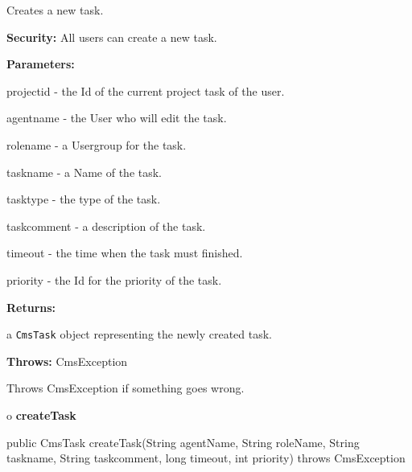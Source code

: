 \begin{description}
\htmlDD Creates a new task. 

{\bf Security:} All users can create a new task. 

\begin{description}
\item {\bf Parameters:}  

projectid - the Id of the current project task of the user.  

agentname - the User who will edit the task.  

rolename - a Usergroup for the task.  

taskname - a Name of the task.  

tasktype - the type of the task.  

taskcomment - a description of the task.  

timeout - the time when the task must finished.  

priority - the Id for the priority of the task.  
\item {\bf Returns:}  

a {\tt CmsTask} object representing the newly created task.  
\item {\bf Throws:} CmsException  

Throws CmsException if something goes wrong.  
\end{description}

\end{description}

o {\bf createTask} 

\begin{PRE}
 public CmsTask createTask(String agentName,
                           String roleName,
                           String taskname,
                           String taskcomment,
                           long timeout,
                           int priority) throws CmsException
\end{PRE}

